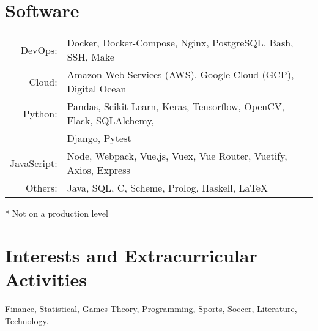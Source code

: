 \documentclass[a4paper,10pt]{article}
\begin{document}
\section{Software}
\renewcommand{\thefootnote}{*}
\begin{threeparttable}
\begin{tabular}{rl}
    DevOps:     & Docker, Docker-Compose, Nginx, PostgreSQL, Bash, SSH, Make \\
    Cloud:      & Amazon Web Services (AWS), Google Cloud (GCP), Digital Ocean
    \vspace{2mm} \\
    Python:     & Pandas, Scikit-Learn, Keras, Tensorflow, OpenCV, Flask, SQLAlchemy, \\
                & Django, Pytest \\
    JavaScript: & Node, Webpack, Vue.js, Vuex, Vue Router, Vuetify, Axios, Express \\
    Others:     & Java, SQL, C, Scheme\footnotemark, Prolog\footnotemark, Haskell\footnotemark, \LaTeX
\end{tabular}
\begin{tablenotes}
    \item[*] Not on a production level
  \end{tablenotes}
\end{threeparttable}

\section{Interests and Extracurricular Activities }
Finance, Statistical, Games Theory, Programming, Sports, Soccer, Literature, Technology.  \\
\end{document}
